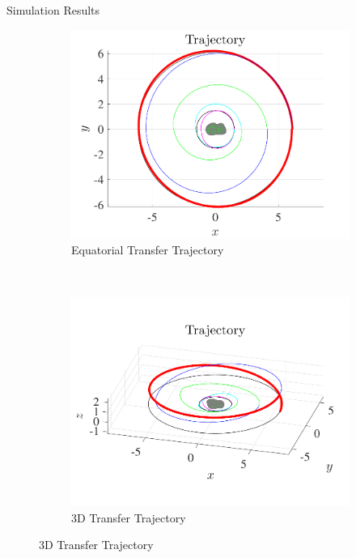 \documentclass[final, usenames, dvipsnames]{beamer}
\newlength{\twocolwidth}
\begin{document}
\begin{frame}[t]
\begin{columns}[T,onlytextwidth]
\begin{column}{\twocolwidth}
\begin{block}{Simulation Results}
\begin{figure}[htbp] 
    \centering 
    \begin{subfigure}[htbp]{0.5\textwidth} 
        \includegraphics[width=\textwidth]{figures/trajectory.pdf} 
        \caption{Equatorial Transfer Trajectory}
    \end{subfigure}~ %
    \begin{subfigure}[htbp]{0.5\textwidth} 
        \includegraphics[width=\textwidth]{figures/trajectory_3d.pdf} 
        \caption*{3D Transfer Trajectory}
    \end{subfigure}
 

\end{figure}
\end{block}
\end{column}
\end{columns}
\end{frame}
\end{document}
